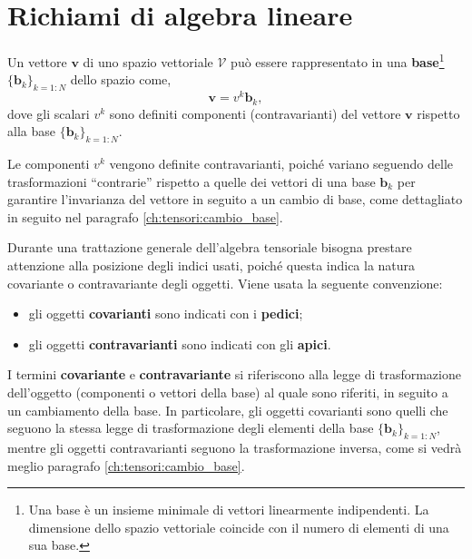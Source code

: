 \vspace{30pt}
\section{Richiami di algebra lineare}
\vspace{10pt}

\begin{definition}
Un vettore $\bm{v}$ di uno spazio vettoriale $\mathcal{V}$ può essere rappresentato in una \textbf{base}\footnote{Una base è un insieme minimale di vettori linearmente indipendenti. La dimensione dello spazio vettoriale coincide con il numero di elementi di una sua base.} $\{ \bm{b}_k \}_{k=1:N}$ dello spazio come, 
\begin{equation}
  \bm{v} = v^k \bm{b}_k ,
\end{equation}
 dove gli scalari $v^k$ sono definiti componenti (contravarianti) del vettore $\bm{v}$ rispetto alla base $\{ \bm{b}_k \}_{k=1:N}$.
\end{definition}

Le componenti $v^k$ vengono definite contravarianti, poiché variano seguendo delle trasformazioni ``contrarie'' rispetto a quelle dei vettori di una base $\bm{b}_k$ per garantire l'invarianza del vettore in seguito a un cambio di base, come dettagliato in seguito nel paragrafo \ref{ch:tensori:cambio_base}.

Durante una trattazione generale dell'algebra tensoriale bisogna prestare attenzione alla posizione degli indici usati, poiché questa indica la natura covariante o contravariante degli oggetti. Viene usata la seguente convenzione:
\begin{itemize}
\item gli oggetti \textbf{covarianti} sono indicati con i \textbf{pedici};
\item gli oggetti \textbf{contravarianti} sono indicati con gli \textbf{apici}.
\end{itemize}
%
    I termini \textbf{covariante} e \textbf{contravariante} si riferiscono alla legge di trasformazione dell'oggetto (componenti o vettori della base) al quale sono riferiti, in seguito a un cambiamento della base. In particolare, gli oggetti covarianti sono quelli che seguono la stessa legge di trasformazione degli elementi della base  $\{ \bm{b}_k \}_{k=1:N}$, mentre gli oggetti contravarianti seguono la trasformazione inversa, come si vedrà meglio paragrafo \ref{ch:tensori:cambio_base}. 
% 

